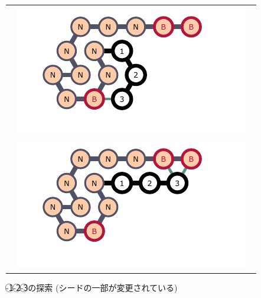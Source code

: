 \documentclass[a4,11pt]{article}
\begin{document}
\begin{figure}[h]
\centering
\begin{tabular}{c}

\begin{minipage}{0.33\hsize}
\centering
	\includegraphics[width=\textwidth]{fig/svg/confex2_0.pdf}
\end{minipage}

\begin{minipage}{0.33\hsize}
\centering
	\includegraphics[width=\textwidth]{fig/svg/confex2_1.pdf}
\end{minipage}

\end{tabular}
\caption{{-}\textcircled{\scriptsize 1}{-}\textcircled{\scriptsize 2}{-}\textcircled{\scriptsize 3}の探索 (シードの一部が変更されている)}
\label{fig:glider2_01}
\end{figure}
\end{document}
